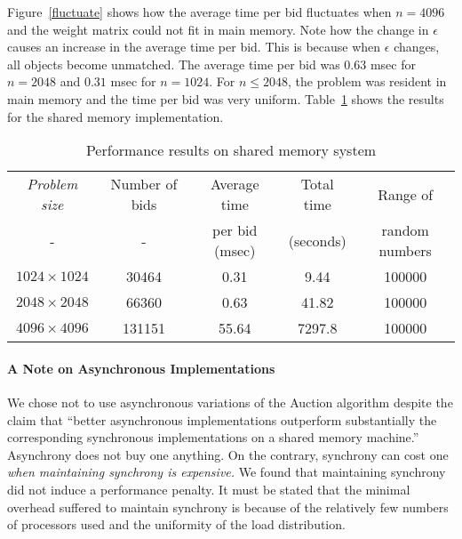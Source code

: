 Figure~\ref{fluctuate} shows how the average time per bid
fluctuates when $n = 4096$ and the weight matrix could not
fit in main memory. Note how the change in $\epsilon$ causes an
increase in the average time per bid. This is because when 
$\epsilon$ changes, all objects become unmatched.
The average time per bid was $0.63$ msec for $n = 2048$
and $0.31$ msec for $n = 1024$. For $n \leq 2048$, the problem was
resident in main memory and the time per bid was very uniform.
Table~\ref{fig_shmem_results} shows the results for the shared
memory implementation.



\begin{table}[hbt]
\begin{center}
\begin{tabular}{|c|c|c|c|c|} \hline \hline
{\em Problem size} 	& Number of bids	& Average time & Total time & Range of \\ 
- & - & per bid (msec) & (seconds) & random numbers \\ \hline \hline 
$1024 \times 1024$ & 30464  & 0.31 	& 9.44 	& 100000 \\ \hline
$2048 \times 2048$ & 66360  & 0.63 	& 41.82	& 100000 \\ \hline
$4096 \times 4096$ & 131151 & 55.64	& 7297.8 & 100000 \\ \hline \hline
\end{tabular}
\end{center}
\caption{Performance results on shared memory system}
\label{fig_shmem_results}
\end{table}

\paragraph{A Note on Asynchronous Implementations}
We chose not to use asynchronous variations of the Auction algorithm
despite the \cite{beca89} claim that ``better asynchronous implementations
outperform substantially the corresponding synchronous implementations
on a shared memory machine.'' Asynchrony does not buy one anything.
On the contrary, synchrony can cost one {\em when maintaining synchrony
is expensive.} We found that
maintaining synchrony did not induce a performance penalty. It must
be stated that the minimal overhead suffered to maintain synchrony
is because of the relatively few numbers of processors used and the
uniformity of the load distribution.



